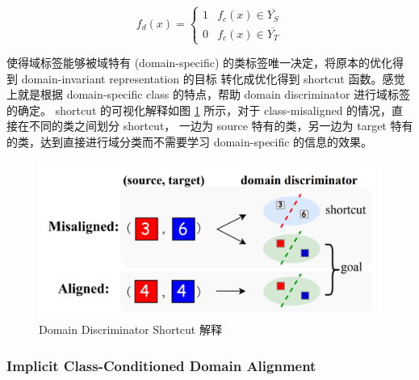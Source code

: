 \documentclass[UTF8]{ctexart}
\begin{document}
                \begin{equation*}
                    f_d(x)=\left\{
                    \begin{matrix}
                        1 & f_c(x)\in \overline{Y_{S}}\\ 
                        0 & f_c(x)\in \overline{Y_{T}}
                    \end{matrix}\right.
                \end{equation*}

                使得域标签能够被域特有 (domain-specific) 的类标签唯一决定，将原本的优化得到 domain-invariant representation 的目标
                转化成优化得到 shortcut 函数。感觉上就是根据 domain-specific class 的特点，帮助 domain discriminator 进行域标签的确定。
                shortcut 的可视化解释如图 \ref{fig:shortcut} 所示，对于 class-misaligned 的情况，直接在不同的类之间划分 shortcut，
                一边为 source 特有的类，另一边为 target 特有的类，达到直接进行域分类而不需要学习 domain-specific 的信息的效果。

                \begin{figure}[ht]
                    \centering
                    \includegraphics[scale=0.38]{Week07_shortcut.png}
                    \caption{Domain Discriminator Shortcut 解释}
                    \label{fig:shortcut}
                \end{figure}
            \subsubsection{Implicit Class-Conditioned Domain Alignment}
\end{document}
